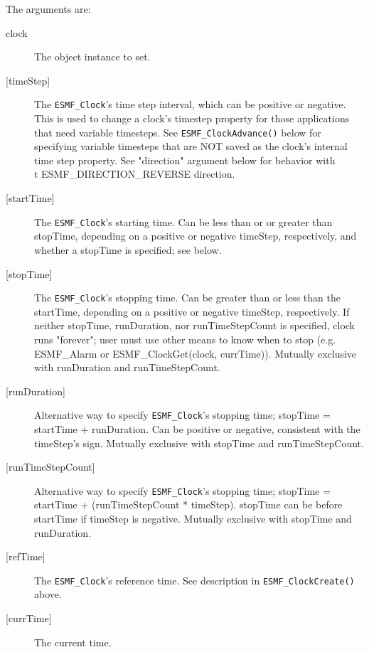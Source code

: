        The arguments are:
       \begin{description}
       \item[clock]
            The object instance to set.
       \item[{[timeStep]}]
            The {\tt ESMF\_Clock}'s time step interval, which can be positive or
            negative.  This is used to change a clock's timestep property for
            those applications that need variable timesteps.  See
            {\tt ESMF\_ClockAdvance()} below for specifying variable timesteps
            that are NOT saved as the clock's internal time step property.
            See "direction" argument below for behavior with
            {\\t ESMF\_DIRECTION\_REVERSE} direction.
       \item[{[startTime]}]
            The {\tt ESMF\_Clock}'s starting time.  Can be less than or
            or greater than stopTime, depending on a positive or negative
            timeStep, respectively, and whether a stopTime is specified;
            see below.
       \item[{[stopTime]}]
            The {\tt ESMF\_Clock}'s stopping time.  Can be greater than or
            less than the startTime, depending on a positive or negative
            timeStep, respectively.  If neither stopTime, runDuration, nor
            runTimeStepCount is specified, clock runs "forever"; user must
            use other means to know when to stop (e.g. ESMF\_Alarm or
            ESMF\_ClockGet(clock, currTime)).
            Mutually exclusive with runDuration and runTimeStepCount.
       \item[{[runDuration]}]
            Alternative way to specify {\tt ESMF\_Clock}'s stopping time;
               stopTime = startTime + runDuration.
            Can be positive or negative, consistent with the timeStep's sign.
            Mutually exclusive with stopTime and runTimeStepCount.
       \item[{[runTimeStepCount]}]
            Alternative way to specify {\tt ESMF\_Clock}'s stopping time;
               stopTime = startTime + (runTimeStepCount * timeStep).
            stopTime can be before startTime if timeStep is negative.
            Mutually exclusive with stopTime and runDuration.
       \item[{[refTime]}]
            The {\tt ESMF\_Clock}'s reference time.
            See description in {\tt ESMF\_ClockCreate()} above.
       \item[{[currTime]}]
            The current time.

\end{description}

